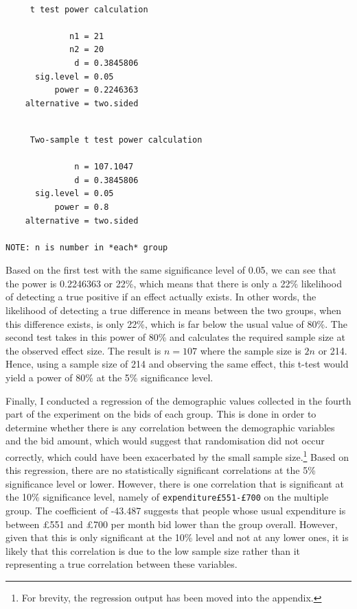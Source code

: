 \documentclass[
]{report}
\begin{document}
\begin{verbatim}

     t test power calculation 

             n1 = 21
             n2 = 20
              d = 0.3845806
      sig.level = 0.05
          power = 0.2246363
    alternative = two.sided
\end{verbatim}

\begin{verbatim}

     Two-sample t test power calculation 

              n = 107.1047
              d = 0.3845806
      sig.level = 0.05
          power = 0.8
    alternative = two.sided

NOTE: n is number in *each* group
\end{verbatim}

Based on the first test with the same significance level of 0.05, we can
see that the power is 0.2246363 or 22\%, which means that there is only
a 22\% likelihood of detecting a true positive if an effect actually
exists. In other words, the likelihood of detecting a true difference in
means between the two groups, when this difference exists, is only 22\%,
which is far below the usual value of 80\%. The second test takes in
this power of 80\% and calculates the required sample size at the
observed effect size. The result is \(n = 107\) where the sample size is
\(2n\) or 214. Hence, using a sample size of 214 and observing the same
effect, this t-test would yield a power of 80\% at the 5\% significance
level.

Finally, I conducted a regression of the demographic values collected in
the fourth part of the experiment on the bids of each group. This is
done in order to determine whether there is any correlation between the
demographic variables and the bid amount, which would suggest that
randomisation did not occur correctly, which could have been exacerbated
by the small sample size.\footnote{ For brevity, the regression output
  has been moved into the appendix.} Based on this regression, there are
no statistically significant correlations at the 5\% significance level
or lower. However, there is one correlation that is significant at the
10\% significance level, namely of \texttt{expenditure£551-£700} on the
multiple group. The coefficient of -43.487 suggests that people whose
usual expenditure is between £551 and £700 per month bid lower than the
group overall. However, given that this is only significant at the 10\%
level and not at any lower ones, it is likely that this correlation is
due to the low sample size rather than it representing a true
correlation between these variables.
\end{document}

